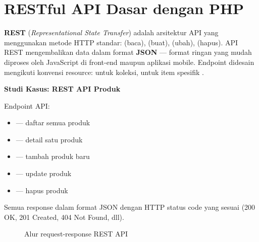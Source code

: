 \section{RESTful API Dasar dengan PHP}

\textbf{REST} (\textit{Representational State Transfer}) adalah arsitektur API yang menggunakan metode HTTP standar:  (baca),  (buat),  (ubah),  (hapus). API REST mengembalikan data dalam format \textbf{JSON} --- format ringan yang mudah diproses oleh JavaScript di front-end maupun aplikasi mobile. Endpoint didesain mengikuti konvensi resource:  untuk koleksi,  untuk item spesifik \cite{phpManual}.

\begin{contoh}
\textbf{Studi Kasus: REST API Produk}

Endpoint API:
\begin{itemize}
  \item {} --- daftar semua produk
  \item {} --- detail satu produk
  \item {} --- tambah produk baru
  \item {} --- update produk
  \item {} --- hapus produk
\end{itemize}
Semua response dalam format JSON dengan HTTP status code yang sesuai (200 OK, 201 Created, 404 Not Found, dll).
\end{contoh}

\begin{figure}[ht]
\centering
{}
\caption{Alur request-response REST API}
\end{figure}


